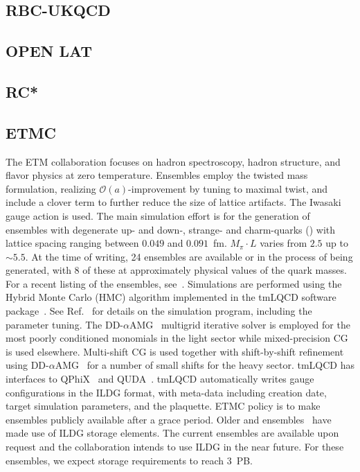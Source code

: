 \documentclass[a4paper,11pt]{article}
\begin{document}
\subsection{RBC-UKQCD}

\subsection{OPEN LAT}

\subsection{RC*}

\subsection{ETMC}
\begin{linenumbers}[1]
The ETM collaboration focuses on hadron spectroscopy, hadron
structure, and flavor physics at zero temperature. Ensembles employ
the twisted mass formulation, realizing $\mathcal{O}(a)$-improvement
by tuning to maximal twist, and include a clover term to further
reduce the size of lattice artifacts. The Iwasaki gauge action is
used. The main simulation effort is for the generation of ensembles
with degenerate up- and down-, strange- and charm-quarks
() with lattice spacing ranging between $0.049$ and
$0.091$~fm. $M_\pi\cdot L$ varies from $2.5$ up to ${\sim}5.5$. At the
time of writing, 24 ensembles are available or in the process of being
generated, with 8 of these at approximately physical values of the
quark masses. For a recent listing of the ensembles,
see~\cite{ETMCPoster:2024}. Simulations are performed using the Hybrid
Monte Carlo (HMC) algorithm implemented in the tmLQCD software
package~\cite{Jansen:2009xp,Deuzeman:2013xaa,Abdel-Rehim:2013wba}. See
Ref.~\cite{Alexandrou:2018egz} for details on the simulation program,
including the parameter tuning. The
DD-$\alpha$AMG~\cite{Frommer:2013fsa,Alexandrou:2016izb} multigrid
iterative solver is employed for the most poorly conditioned monomials
in the light sector while mixed-precision CG is used
elsewhere. Multi-shift CG is used together with shift-by-shift
refinement using DD-$\alpha$AMG~\cite{Alexandrou:2018wiv} for a number
of small shifts for the heavy sector. tmLQCD has interfaces to
QPhiX~\cite{Joo:2013lwm} and QUDA~\cite{Clark:2009wm,Babich:2011np}.
tmLQCD automatically writes gauge configurations in the ILDG format,
with meta-data including creation date, target simulation parameters,
and the plaquette. ETMC policy is to make ensembles publicly
available after a grace period. Older  and 
ensembles~\cite{Baron:2010bv,EuropeanTwistedMass:2010voq,ETM:2009ztk}
have made use of ILDG storage elements. The current ensembles are
available upon request and the collaboration intends to use ILDG in
the near future. For these ensembles, we expect storage requirements
to reach 3~PB.
\end{linenumbers}
\end{document}
